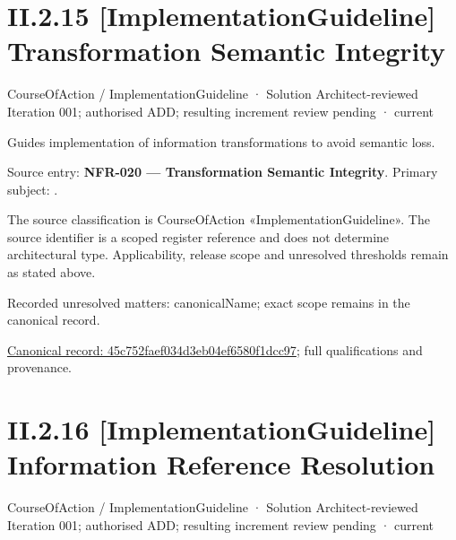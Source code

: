 \section*{II.2.15 [ImplementationGuideline] Transformation Semantic Integrity}
\label{navigation:II.2.15}

\label{element:45c752faef034d3eb04ef6580f1dcc97}
{\small CourseOfAction / ImplementationGuideline · Solution Architect-reviewed Iteration 001; authorised ADD; resulting increment review pending · current}\par

Guides implementation of information transformations to avoid semantic loss.



Source entry: \textbf{NFR-020 — Transformation Semantic Integrity}. Primary subject: \texttt{}.



The source classification is CourseOfAction «ImplementationGuideline». The source identifier is a scoped register reference and does not determine architectural type. Applicability, release scope and unresolved thresholds remain as stated above.


{\small Recorded unresolved matters: canonicalName; exact scope remains in the canonical record.}\par
{\footnotesize \href{../../../../continuum/strategy/course-of-action/implementation-guideline/45c752faef034d3eb04ef6580f1dcc97.md}{Canonical record: 45c752faef034d3eb04ef6580f1dcc97}; full qualifications and provenance.}\par
\section*{II.2.16 [ImplementationGuideline] Information Reference Resolution}
\label{navigation:II.2.16}

\label{element:b5c3dcfd6ece40fdb6c8694924db2ae6}
{\small CourseOfAction / ImplementationGuideline · Solution Architect-reviewed Iteration 001; authorised ADD; resulting increment review pending · current}\par

